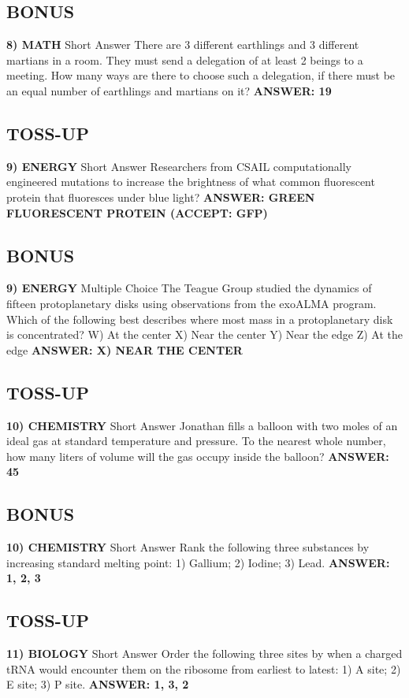 \documentclass{article}
\begin{document}
\subsection*{BONUS}
\textbf{8) MATH}
Short Answer There are 3 different earthlings and 3 different martians in a room.
They must send a delegation of at least 2 beings to a meeting.
How many ways are there to choose such a delegation, if there must be an equal number of earthlings and martians on it?
\textbf{ANSWER: 19}

\newpage

\subsection*{TOSS-UP}
\textbf{9) ENERGY}
Short Answer Researchers from CSAIL computationally engineered mutations to increase the brightness of what common fluorescent protein that fluoresces under blue light?
\textbf{ANSWER: GREEN FLUORESCENT PROTEIN (ACCEPT: GFP)}

\subsection*{BONUS}
\textbf{9) ENERGY}
Multiple Choice The Teague Group studied the dynamics of fifteen protoplanetary disks using observations from the exoALMA program.
Which of the following best describes where most mass in a protoplanetary disk is concentrated?
W) At the center
X) Near the center
Y) Near the edge
Z) At the edge
\textbf{ANSWER: X) NEAR THE CENTER}

\subsection*{TOSS-UP}
\textbf{10) CHEMISTRY}
Short Answer Jonathan fills a balloon with two moles of an ideal gas at standard temperature and pressure.
To the nearest whole number, how many liters of volume will the gas occupy inside the balloon?
\textbf{ANSWER: 45}

\subsection*{BONUS}
\textbf{10) CHEMISTRY}
Short Answer Rank the following three substances by increasing standard melting point: 1) Gallium; 2) Iodine; 3) Lead.
\textbf{ANSWER: 1, 2, 3}

\newpage

\subsection*{TOSS-UP}
\textbf{11) BIOLOGY}
Short Answer Order the following three sites by when a charged tRNA would encounter them on the ribosome from earliest to latest: 1) A site; 2) E site; 3) P site.
\textbf{ANSWER: 1, 3, 2}
\end{document}
